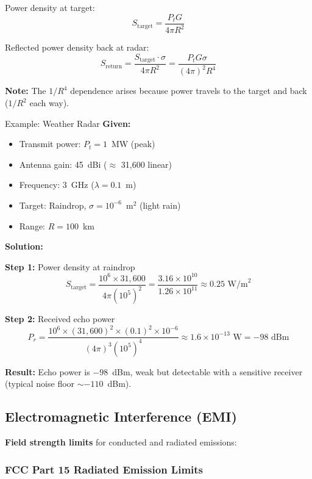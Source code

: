 Power density at target:
\begin{equation}
S_{\text{target}} = \frac{P_t G}{4\pi R^2}
\label{eq:power-density-target}
\end{equation}

Reflected power density back at radar:
\begin{equation}
S_{\text{return}} = \frac{S_{\text{target}} \cdot \sigma}{4\pi R^2} = \frac{P_t G \sigma}{(4\pi)^2 R^4}
\label{eq:power-density-return}
\end{equation}

\textbf{Note:} The $1/R^4$ dependence arises because power travels to the target and back ($1/R^2$ each way).

\begin{calloutbox}{Example: Weather Radar}
\textbf{Given:}
\begin{itemize}
\item Transmit power: $P_t = 1$~MW (peak)
\item Antenna gain: 45~dBi ($\approx$ 31,600 linear)
\item Frequency: 3~GHz ($\lambda = 0.1$~m)
\item Target: Raindrop, $\sigma = 10^{-6}$~m$^2$ (light rain)
\item Range: $R = 100$~km
\end{itemize}

\textbf{Solution:}

\textbf{Step 1:} Power density at raindrop
\[
S_{\text{target}} = \frac{10^6 \times 31{,}600}{4\pi (10^5)^2} = \frac{3.16 \times 10^{10}}{1.26 \times 10^{11}} \approx 0.25 \text{~W/m}^2
\]

\textbf{Step 2:} Received echo power
\[
P_r = \frac{10^6 \times (31{,}600)^2 \times (0.1)^2 \times 10^{-6}}{(4\pi)^3 (10^5)^4} \approx 1.6 \times 10^{-13} \text{~W} = -98 \text{~dBm}
\]

\textbf{Result:} Echo power is $-98$~dBm, weak but detectable with a sensitive receiver (typical noise floor $\sim$$-110$~dBm).
\end{calloutbox}

\subsection{Electromagnetic Interference
(EMI)}\label{electromagnetic-interference-emi}

\textbf{Field strength limits} for conducted and radiated emissions:

\subsubsection{FCC Part 15 Radiated Emission
Limits}\label{fcc-part-15-radiated-emission-limits}


